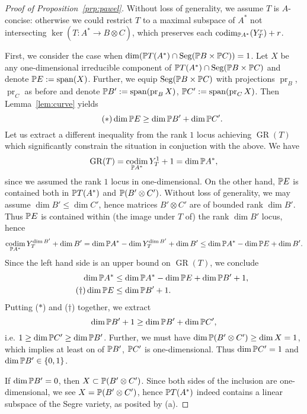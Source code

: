 \documentclass[a4paper,10pt]{article}
\def\set#1{\left\{#1\right\}}
\DeclareMathOperator{\codim}{codim}
\DeclareMathOperator{\Seg}{Seg}
\DeclareMathOperator{\GR}{GR}
\DeclareMathOperator{\pr}{pr}
\DeclareMathOperator{\spn}{span}
\theoremstyle{definition}
\theoremstyle{remark}
\begin{document}
\begin{proof}[Proof of Proposition~\ref{prp:pawel}]
    Without loss of generality, we assume $T$ is $A$-concise: otherwise we could restrict $T$ to a maximal subspace of $A^*$ not intersecting $\ker(T:A^*\to B\otimes C)$, which preserves each $\codim_{\pe A^*}(Y^r_T)+r$.

    First, we consider the case when $\dim(\pe T(A^*)\cap \Seg(\pe B\times \pe C))=1$. Let $X$ be any one-dimensional irreducible component of $\pe T(A^*)\cap \Seg(\pe B\times \pe C)$ and denote $\pe E:=\spn(X)$. Further, we equip $\Seg(\pe B\times\pe C)$ with projections $\pr_B$, $\pr_C$ as before and denote $\pe B':=\spn(\pr_B X)$, $\pe C' := \spn(\pr_C X)$. Then Lemma~\ref{lem:curve} yields
    \begin{equation}
        \tag{$\ast$}
        \dim\pe E \geq \dim\pe B' + \dim\pe C'.
    \end{equation}
    Let us extract a different inequality from the rank $1$ locus achieving $\GR(T)$ which significantly constrain the situation in conjuction with the above. We have
    \[
        \GR(T) = \codim_{\pe A^*} Y^1_T + 1 = \dim\pe A^*,
    \]
    since we assumed the rank $1$ locus in one-dimensional. On the other hand, $\pe E$ is contained both in $\pe T(A^*)$ and $\pe(B'\otimes C')$. Without loss of generality, we may assume $\dim B'\leq \dim C'$, hence matrices $B'\otimes C'$ are of bounded rank $\dim B'$. Thus $\pe E$ is contained within (the image under $T$ of) the rank $\dim B'$ locus, hence
    \[
        \codim_{\pe A^*}Y^{\dim B'}_T+\dim B' = \dim\pe A^* - \dim Y^{\dim B'}_T +\dim B' \leq \dim \pe A^* -\dim\pe E +\dim B'.
    \]
    Since the left hand side is an upper bound on $\GR(T)$, we conclude
    \begin{align}
        \nonumber
        \dim \pe A^* &\leq \dim\pe A^* - \dim\pe E + \dim \pe B' + 1,\\
        \tag{$\dag$}
        \dim \pe E &\leq \dim\pe B'+1.
    \end{align}
    Putting ($\ast$) and ($\dag$) together, we extract
    \[
        \dim\pe B'+1 \geq \dim\pe B'+\dim\pe C',
    \]
    i.e. $1\geq\dim\pe C'\geq\dim\pe B'$. Further, we must have $\dim\pe(B'\otimes C')\geq\dim X = 1$, which implies at least on of $\pe B'$, $\pe C'$ is one-dimensional. Thus $\dim\pe C' = 1$ and $\dim\pe B'\in\set{0,1}$.

    If $\dim\pe B' = 0$, then $X\subset\pe (B'\otimes C')$. Since both sides of the inclusion are one-dimensional, we see $X=\pe(B'\otimes C')$, hence $\pe T(A^*)$ indeed contains a linear subspace of the Segre variety, as posited by (a).


\end{proof}
\end{document}
